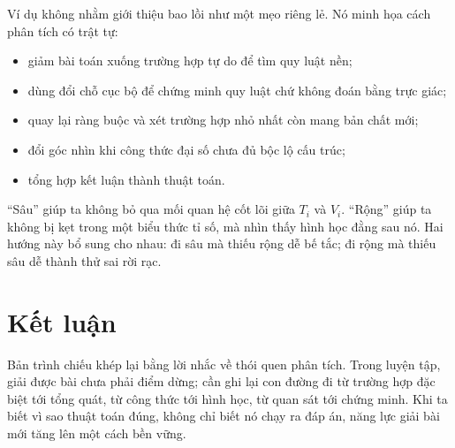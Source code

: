 \documentclass[11pt]{article}
\begin{document}
Ví dụ không nhằm giới thiệu bao lồi như một mẹo riêng lẻ. Nó minh họa cách
phân tích có trật tự:
\begin{itemize}
  \item giảm bài toán xuống trường hợp tự do để tìm quy luật nền;
  \item dùng đổi chỗ cục bộ để chứng minh quy luật chứ không đoán bằng trực
  giác;
  \item quay lại ràng buộc và xét trường hợp nhỏ nhất còn mang bản chất mới;
  \item đổi góc nhìn khi công thức đại số chưa đủ bộc lộ cấu trúc;
  \item tổng hợp kết luận thành thuật toán.
\end{itemize}

``Sâu'' giúp ta không bỏ qua mối quan hệ cốt lõi giữa \(T_i\) và \(V_i\).
``Rộng'' giúp ta không bị kẹt trong một biểu thức tỉ số, mà nhìn thấy hình học
đằng sau nó. Hai hướng này bổ sung cho nhau: đi sâu mà thiếu rộng dễ bế tắc;
đi rộng mà thiếu sâu dễ thành thử sai rời rạc.

\section{Kết luận}

Bản trình chiếu khép lại bằng lời nhắc về thói quen phân tích. Trong luyện
tập, giải được bài chưa phải điểm dừng; cần ghi lại con đường đi từ trường hợp
đặc biệt tới tổng quát, từ công thức tới hình học, từ quan sát tới chứng minh.
Khi ta biết vì sao thuật toán đúng, không chỉ biết nó chạy ra đáp án, năng lực
giải bài mới tăng lên một cách bền vững.
\end{document}

